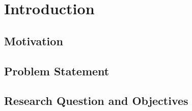 
\chapter{Introduction}
\label{chap:introduction}

\section{Motivation}
\label{sec:motivation}


\lipsum[2]

\begin{criticalinsight}
\end{criticalinsight}

\section{Problem Statement}
\label{sec:problem}


\lipsum[3]

\begin{criticalinsight}
\end{criticalinsight}

\section{Research Question and Objectives}
\label{sec:research-question}

